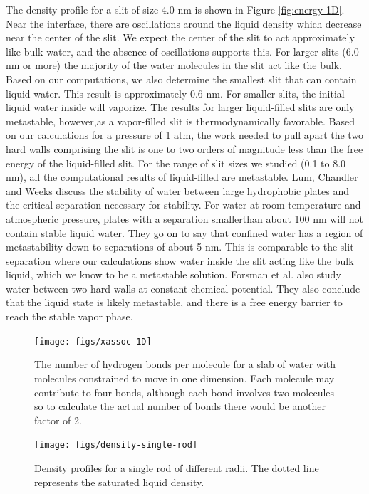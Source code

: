 \documentclass[letterpaper,twocolumn,amsmath,amssymb,prb]{revtex4-1}
\begin{document}
The density profile for a slit of size 4.0 nm is shown in Figure
\ref{fig:energy-1D}. Near the interface, there are oscillations around the
liquid density which decrease near the center of the slit. We expect the center
of the slit to act approximately like bulk water, and the absence of
oscillations supports this. For larger slits (6.0 nm or more) the majority of
the water molecules in the slit act like the bulk. Based on our computations, we
also determine the smallest slit that can contain liquid water. This result is
approximately 0.6 nm. For smaller slits, the initial liquid water inside will
vaporize. The results for larger liquid-filled slits are only metastable,
however,as a vapor-filled slit is thermodynamically favorable. Based on our
calculations for a pressure of 1 atm, the work needed to pull apart
the two hard walls comprising the slit is one to two orders of magnitude less
than the free energy of the liquid-filled slit. For the range of slit sizes we
studied (0.1 to 8.0 nm), all the computational results of liquid-filled are
metastable. Lum, Chandler and Weeks \cite{lum1999hydrophobicity} discuss the
stability of water between large hydrophobic plates and the critical separation
necessary for stability. For water at room temperature and atmospheric pressure,
plates with a separation smallerthan about 100 nm will not contain stable liquid
water. They go on to say that confined water has a region of metastability down
to separations of about 5 nm. This is comparable to the slit separation where
our calculations show water inside the slit acting like the bulk liquid, which
we know to be a metastable solution. Forsman et al.\cite{forsman1996computer}
also study water between two hard walls at constant chemical potential. They 
also conclude that the liquid state is likely metastable, and there is a free
energy barrier to reach the stable vapor phase. 

\begin{figure}
\begin{center}
\texttt{[image: figs/xassoc-1D]}
\end{center}
\caption{The number of hydrogen bonds per molecule for a slab of water 
with molecules constrained to move in one dimension. Each molecule may
contribute to
four bonds, although each bond involves two molecules so to calculate the
actual 
number of bonds there would be another factor of 2.}
\label{fig:xassoc-1D}
\end{figure}

\begin{figure}
\begin{center}
\texttt{[image: figs/density-single-rod]}
\end{center}
\caption{ Density profiles for a single rod of different radii. The dotted line
represents the saturated liquid density.  }
\label{fig:density-single-rod}
\end{figure}
\end{document}
